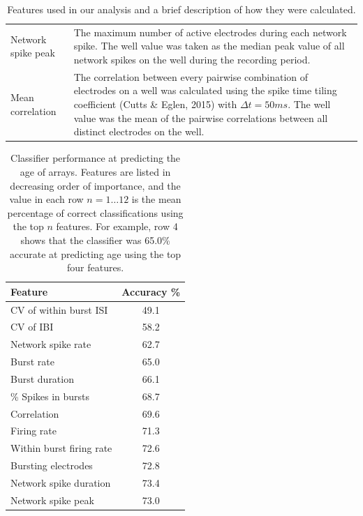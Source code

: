\documentclass{article}
\begin{document}
\begin{table}
\begin{tabular}{|l|m{11cm}|}
  		\\ Network spike peak  & The maximum number of active electrodes during each network spike. The well value was taken as the median peak value of all network spikes on the well during the recording period. 
  		\\ Mean correlation & The correlation between every pairwise combination of electrodes on a well was calculated using the spike time tiling coefficient (Cutts \& Eglen, 2015) with $\Delta t = 50ms$. The well value was the mean of the pairwise correlations between all distinct electrodes on the well. 
  		\\ \hline
  	\end{tabular}
  \caption{Features used in our analysis and a brief description of how
    they were calculated.}
\end{table}

\begin{table}
  \centering
  \begin{tabular}{|l|c|}
  	\hline
  	\textbf{Feature} & \textbf{Accuracy \%}
  	\\ \hline 
  	CV of within burst ISI & 49.1
  	\\CV of IBI & 58.2
  	\\ Network spike rate& 62.7
  	\\ Burst rate & 65.0
  	\\ Burst duration& 66.1
  	\\ \% Spikes in bursts & 68.7
  	\\Correlation & 69.6
  	\\Firing rate & 71.3
  	\\Within burst firing rate & 72.6
  	\\Bursting electrodes & 72.8
  	\\ Network spike duration & 73.4
  	\\Network spike peak & 73.0
  	\\ \hline
  \end{tabular}
  \caption {Classifier performance at predicting the age of
arrays. Features are listed in decreasing order of importance, and the
value in each row $n=1 \ldots 12$ is the mean percentage of correct
classifications using the top $n$ features.  For example, row 4 shows
that the classifier was 65.0\% accurate at predicting age using the
top four features. }
\end{table}
\end{document}
